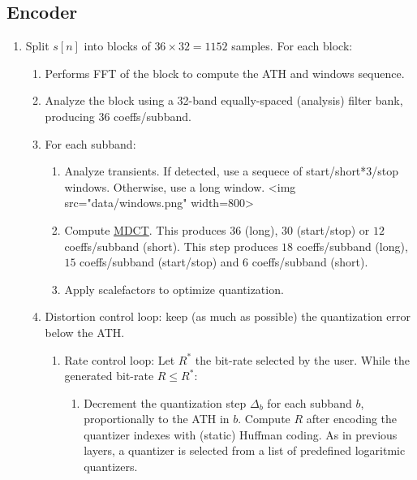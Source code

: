 \subsection{Encoder}
\begin{enumerate}
\item Split $s[n]$ into blocks of $36\times 32=1152$ samples. For each
  block:
  \begin{enumerate}
  \item Performs FFT of the block to compute the ATH and windows
    sequence.
  \item Analyze the block using a 32-band equally-spaced (analysis)
    filter bank, producing $36$ coeffs/subband.
  \item For each subband:
    \begin{enumerate}
    \item Analyze transients. If detected, use a sequece of
      start/short*3/stop windows. Otherwise, use a long window.  <img
      src="data/windows.png" width=800>
    \item Compute
      \href{https://en.wikipedia.org/wiki/Modified_discrete_cosine_transform}{MDCT}. This
      produces $36$ (long), $30$ (start/stop) or $12$ coeffs/subband
      (short). This step produces $18$ coeffs/subband (long), $15$
      coeffs/subband (start/stop) and $6$ coeffs/subband (short).
      \item Apply scalefactors to optimize quantization.
     \end{enumerate}
   \item Distortion control loop: keep (as much as possible) the
     quantization error below the ATH.
     \begin{enumerate}
     \item Rate control loop: Let $R^*$ the bit-rate selected by the
       user. While the generated bit-rate $R\leq R^*$:
       \begin{enumerate}
       \item Decrement the quantization step $\Delta_b$ for each
         subband $b$, proportionally to the ATH in $b$. Compute $R$
         after encoding the quantizer indexes with (static) Huffman
         coding. As in previous layers, a quantizer is selected from a
         list of predefined logaritmic quantizers.
       \end{enumerate}
     \end{enumerate}
  \end{enumerate}
\end{enumerate}

